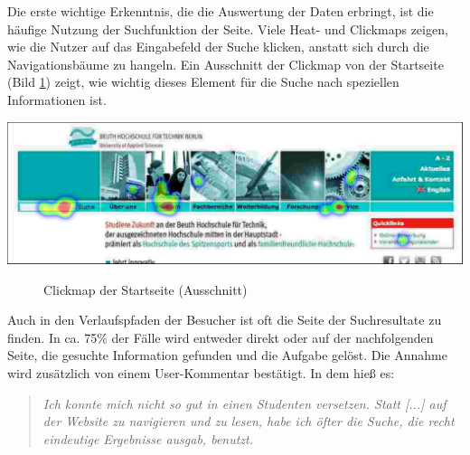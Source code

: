 Die erste wichtige Erkenntnis, die die Auswertung der Daten erbringt, ist die häufige Nutzung der Suchfunktion der Seite. Viele Heat- und Clickmaps zeigen, wie die Nutzer auf das Eingabefeld der Suche klicken, anstatt sich durch die Navigationsbäume zu hangeln. Ein Ausschnitt der Clickmap von der Startseite (Bild \ref{clickmapSearch}) zeigt, wie wichtig dieses Element für die Suche nach speziellen Informationen ist.
\\
\begin{center}
\includegraphics[scale=0.52]{./images/clickmap-search}
\end{center}
\begin{figure}[htb]
   \centering
   \caption{Clickmap der Startseite (Ausschnitt)}
    \label{clickmapSearch}
\end{figure}

Auch in den Verlaufspfaden der Besucher ist oft die Seite der Suchresultate zu finden. In ca. 75\% der Fälle wird entweder direkt oder auf der nachfolgenden Seite, die gesuchte Information gefunden und die Aufgabe gelöst. Die Annahme wird zusätzlich von einem User-Kommentar bestätigt. In dem hieß es:

\begin{quote}
     \glqq \textit{Ich konnte mich nicht so gut in einen Studenten versetzen. Statt [...] auf der Website zu navigieren und zu lesen, habe ich öfter die Suche, die recht eindeutige Ergebnisse ausgab, benutzt.}\grqq{}
\end{quote}


